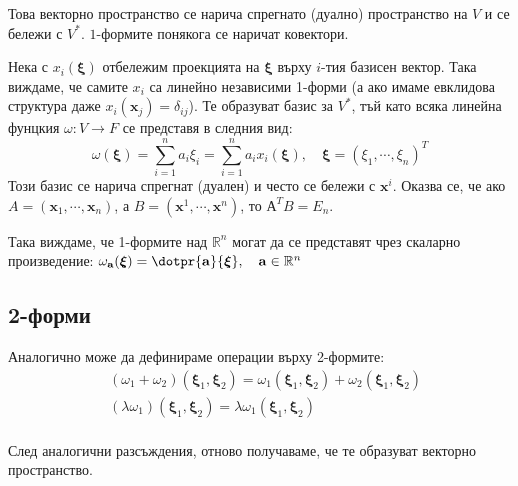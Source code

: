 \documentclass[12pt]{article}
\newcommand\func[3]{#1:#2 \to #3}
\newcommand\nstfunc[1]{\func{#1}{V}{F}}
\newcommand\myxi[0]{\boldsymbol{\xi}}
\begin{document}
\begin{large}
Това векторно пространство се нарича спрегнато (дуално) пространство на $V$ и се бележи с $V^{*}$. $1$-формите понякога се наричат ковектори. 

Нека с $x_i(\myxi)$ отбележим проекцията на $\myxi$ върху $i$-тия базисен вектор. Така виждаме, че  самите $x_i$ са линейно независими 1-форми (а ако имаме евклидова структура даже $x_i (\mathbf{x}_j) = \delta_{ij}$). Те образуват базис за $V^{*}$, тъй като всяка линейна фунцкия $\nstfunc{\omega}$ се представя в следния вид: 
\begin{equation*}
\omega(\myxi) = \sum_{i=1}^{n} a_{i} \xi_{i} = \sum_{i=1}^{n} a_{i} x_{i} (\myxi), \quad \myxi=(\xi_1,\cdots,\xi_n)^{T}
\end{equation*}
Този базис се нарича спрегнат (дуален) и често се бележи с $\mathbf{x}^i$. Оказва се, че ако $A=(\mathbf{x}_1,\cdots,\mathbf{x}_n)$, а $B=(\mathbf{x}^1,\cdots,\mathbf{x}^n)$, то $А^T B = E_n$.

Така виждаме, че 1-формите над $\mathbb{R}^n$ могат да се представят чрез скаларно произведение: $\omega_{\mathbf{a}}(\myxi)=\dotpr{\mathbf{a}}{\myxi}, \quad \mathbf{a} \in \mathbb{R}^n$ 


\subsection{2-форми}
Аналогично може да дефинираме операции върху 2-формите:
\begin{align*}
&(\omega_1+\omega_2)(\myxi_1,\myxi_2)=\omega_1(\myxi_1,\myxi_2)+\omega_2(\myxi_1,\myxi_2) \\
&(\lambda\omega_1)(\myxi_1,\myxi_2)=\lambda\omega_1(\myxi_1,\myxi_2) \\
\end{align*}

След аналогични разсъждения, отново получаваме, че те образуват векторно пространство.


\end{large}
\end{document}
